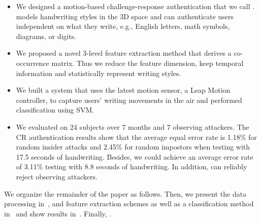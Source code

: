 \begin{itemize}
\vspace{-1.5mm}
\item We designed a motion-based challenge-response authentication that we call \CiT. \CiT models handwriting styles in the 3D space and can authenticate users independent on what they write, e.g., English letters, math symbols, diagrams, or digits. 

\item We proposed a novel 3-level feature extraction method that derives a co-occurrence matrix. Thus we reduce the feature dimension, keep temporal information and statistically represent writing styles. 

\item We built a system that uses the latest motion sensor, a Leap Motion controller, to capture users' writing movements in the air and performed classification using SVM. 


\item We evaluated \CiT on 24 subjects over 7 months and 7 observing attackers.
The CR authentication results show that the average equal error rate is 1.18\% for random insider attacks and 2.45\% for random impostors when testing with 17.5 seconds of handwriting. Besides, we could achieve an average error rate of 3.11\% testing with 8.8 seconds of handwriting. In addition, \CiT can reliably reject observing attackers.

\vspace{-1mm}
\end{itemize}

We organize the remainder of the paper as follows.  Then, we present the data processing in~, and feature extraction schemes as well as a classification method in~ and show results in~. Finally, . 

